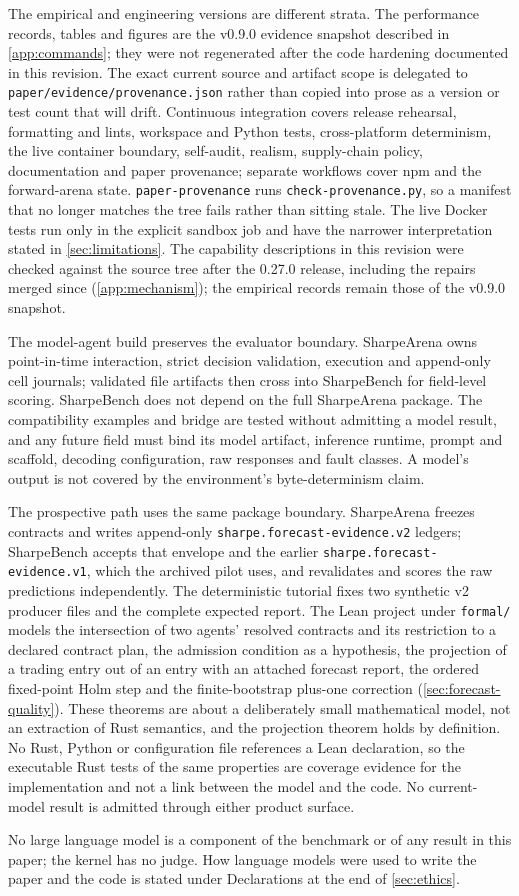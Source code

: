 The empirical and engineering versions are different strata. The performance records, tables and figures are the v0.9.0 evidence snapshot described in \cref{app:commands}; they were not regenerated after the code hardening documented in this revision. The exact current source and artifact scope is delegated to \texttt{paper/evidence/provenance.json} rather than copied into prose as a version or test count that will drift. Continuous integration covers release rehearsal, formatting and lints, workspace and Python tests, cross-platform determinism, the live container boundary, self-audit, realism, supply-chain policy, documentation and paper provenance; separate workflows cover npm and the forward-arena state. \texttt{paper-provenance} runs \texttt{check-provenance.py}, so a manifest that no longer matches the tree fails rather than sitting stale. The live Docker tests run only in the explicit sandbox job and have the narrower interpretation stated in \cref{sec:limitations}. The capability descriptions in this revision were checked against the source tree after the 0.27.0 release, including the repairs merged since (\cref{app:mechanism}); the empirical records remain those of the v0.9.0 snapshot.

The model-agent build preserves the evaluator boundary. SharpeArena \citep{toca2026sharpearena} owns point-in-time interaction, strict decision validation, execution and append-only cell journals; validated file artifacts then cross into SharpeBench for field-level scoring. SharpeBench does not depend on the full SharpeArena package. The compatibility examples and bridge are tested without admitting a model result, and any future field must bind its model artifact, inference runtime, prompt and scaffold, decoding configuration, raw responses and fault classes. A model's output is not covered by the environment's byte-determinism claim.

The prospective path uses the same package boundary. SharpeArena freezes contracts and writes append-only \texttt{sharpe.forecast-evidence.v2} ledgers; SharpeBench accepts that envelope and the earlier \texttt{sharpe.forecast-evidence.v1}, which the archived pilot uses, and revalidates and scores the raw predictions independently. The deterministic tutorial fixes two synthetic v2 producer files and the complete expected report. The Lean project under \texttt{formal/} models the intersection of two agents' resolved contracts and its restriction to a declared contract plan, the admission condition as a hypothesis, the projection of a trading entry out of an entry with an attached forecast report, the ordered fixed-point Holm step and the finite-bootstrap plus-one correction (\cref{sec:forecast-quality}). These theorems are about a deliberately small mathematical model, not an extraction of Rust semantics, and the projection theorem holds by definition. No Rust, Python or configuration file references a Lean declaration, so the executable Rust tests of the same properties are coverage evidence for the implementation and not a link between the model and the code. No current-model result is admitted through either product surface.

No large language model is a component of the benchmark or of any result in this paper; the kernel has no judge. How language models were used to write the paper and the code is stated under Declarations at the end of \cref{sec:ethics}.
